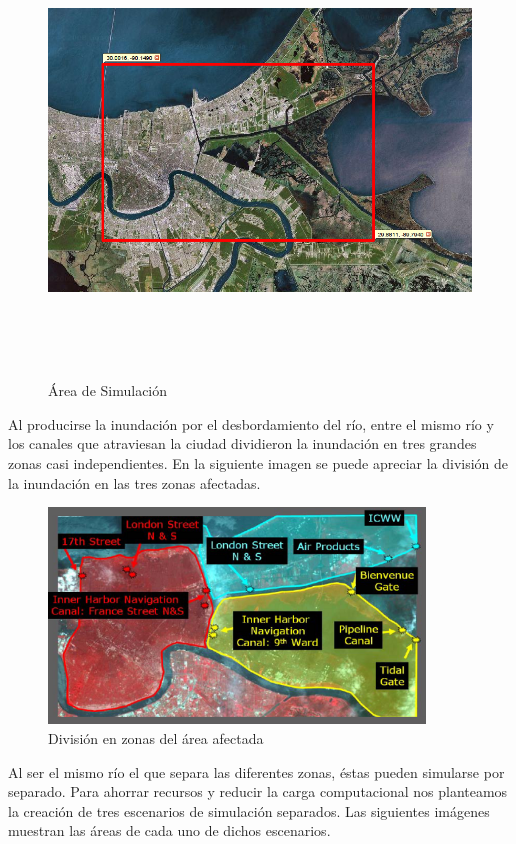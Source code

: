 \begin{figure}[H]
 \centering
 \includegraphics[height=120mm,angle=90]{figuras/cap6/NOarea1.png}
 \caption{Área de Simulación}
\end{figure}

Al producirse la inundación por el desbordamiento del río, entre el mismo río y
los canales que atraviesan la ciudad dividieron la inundación en tres grandes
zonas casi independientes. En la siguiente imagen se puede apreciar la división
de la inundación en las tres zonas afectadas.

\begin{figure}[H]
 \centering
 \includegraphics[width=100mm]{figuras/cap6/affected.png}
 \caption{División en zonas del área afectada}
\end{figure}

Al ser el mismo río el que separa las diferentes zonas, éstas pueden simularse
por separado. Para ahorrar recursos y reducir la carga computacional nos
planteamos la creación de tres escenarios de simulación separados. Las
siguientes imágenes muestran las áreas de cada uno de dichos escenarios.

